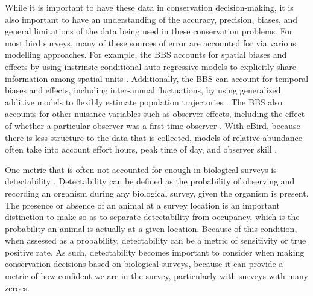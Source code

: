 \par While it is important to have these data in conservation decision-making, it is also important to have an understanding of the accuracy, precision, biases, and general limitations of the data being used in these conservation problems.
For most bird surveys, many of these sources of error are accounted for via various modelling approaches.
For example, the BBS accounts for spatial biases and effects by using instrinsic conditional auto-regressive models \citep{besag_bayesian_1991} to explicitly share information among spatial units \citep{smith_patterns_2023}. 
Additionally, the BBS can account for temporal biases and effects, including inter-annual fluctuations, by using generalized additive models \citep{wood_generalized_2017} to flexibly estimate population trajectories \citep{smith_north_2021}.
The BBS also accounts for other nuisance variables such as observer effects, including the effect of whether a particular observer was a first-time observer \citep{kendall_first-time_1996}.
With eBird, because there is less structure to the data that is collected, models of relative abundance often take into account effort hours, peak time of day, and observer skill \citep{johnston_estimates_2018, fink_double_2023}.

\par One metric that is often not accounted for enough in biological surveys is detectability \citep{bennett_how_2024}.
Detectability can be defined as the probability of observing and recording an organism during any biological survey, given the organism is present.
The presence or absence of an animal at a survey location is an important distinction to make so as to separate detectability from occupancy, which is the probability an animal is actually at a given location.
Because of this condition, when assessed as a probability, detectability can be a metric of sensitivity or true positive rate.
As such, detectability becomes important to consider when making conservation decisions based on biological surveys, because it can provide a metric of how confident we are in the survey, particularly with surveys with many zeroes.

